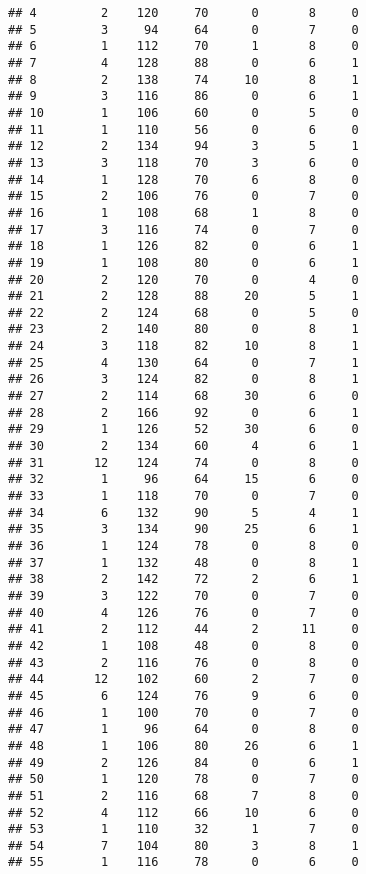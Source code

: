 \documentclass[
]{article}
\begin{document}
\begin{verbatim}
## 4         2    120     70      0       8     0
## 5         3     94     64      0       7     0
## 6         1    112     70      1       8     0
## 7         4    128     88      0       6     1
## 8         2    138     74     10       8     1
## 9         3    116     86      0       6     1
## 10        1    106     60      0       5     0
## 11        1    110     56      0       6     0
## 12        2    134     94      3       5     1
## 13        3    118     70      3       6     0
## 14        1    128     70      6       8     0
## 15        2    106     76      0       7     0
## 16        1    108     68      1       8     0
## 17        3    116     74      0       7     0
## 18        1    126     82      0       6     1
## 19        1    108     80      0       6     1
## 20        2    120     70      0       4     0
## 21        2    128     88     20       5     1
## 22        2    124     68      0       5     0
## 23        2    140     80      0       8     1
## 24        3    118     82     10       8     1
## 25        4    130     64      0       7     1
## 26        3    124     82      0       8     1
## 27        2    114     68     30       6     0
## 28        2    166     92      0       6     1
## 29        1    126     52     30       6     0
## 30        2    134     60      4       6     1
## 31       12    124     74      0       8     0
## 32        1     96     64     15       6     0
## 33        1    118     70      0       7     0
## 34        6    132     90      5       4     1
## 35        3    134     90     25       6     1
## 36        1    124     78      0       8     0
## 37        1    132     48      0       8     1
## 38        2    142     72      2       6     1
## 39        3    122     70      0       7     0
## 40        4    126     76      0       7     0
## 41        2    112     44      2      11     0
## 42        1    108     48      0       8     0
## 43        2    116     76      0       8     0
## 44       12    102     60      2       7     0
## 45        6    124     76      9       6     0
## 46        1    100     70      0       7     0
## 47        1     96     64      0       8     0
## 48        1    106     80     26       6     1
## 49        2    126     84      0       6     1
## 50        1    120     78      0       7     0
## 51        2    116     68      7       8     0
## 52        4    112     66     10       6     0
## 53        1    110     32      1       7     0
## 54        7    104     80      3       8     1
## 55        1    116     78      0       6     0

\end{verbatim}
\end{document}
